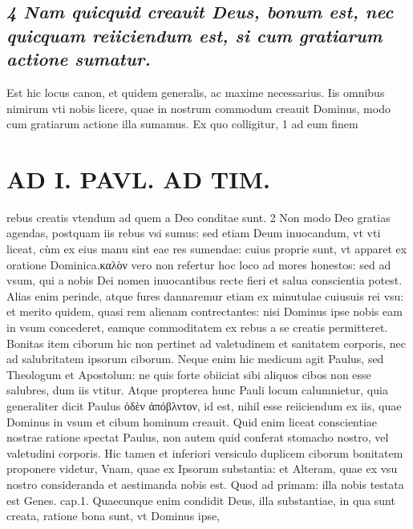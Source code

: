 \documentclass{article}
\begin{document}
\begin{pages}
\subsection*{\textit{4 Nam quicquid creauit Deus, bonum est, nec quicquam reiiciendum est, si cum gratiarum actione sumatur. }}\pstart Est hic locus canon, et quidem generalis, ac maxime necessarius. Iis omnibus nimirum vti nobis licere, quae in nostrum commodum creauit Dominus, modo cum gratiarum actione illa sumamus. Ex quo colligitur, 1 ad eum finem  \pend
\section*{AD I. PAVL. AD TIM. }
\marginpar{[ p.196 ]}\pstart rebus creatis vtendum ad quem a Deo conditae sunt. 2 Non modo Deo gratias agendas, postquam iis rebus vsi sumus: sed etiam Deum inuocandum, vt vti liceat, cùm ex eius manu sint eae res sumendae: cuius proprie sunt, vt apparet ex oratione Dominica.καλὸν vero non refertur hoc loco ad mores honestos: sed ad vsum, qui a nobis Dei nomen inuocantibus recte fieri et salua conscientia potest. Alias enim perinde, atque fures dannaremur etiam ex minutulae cuiusuis rei vsu: et merito quidem, quasi rem alienam contrectantes: nisi Dominus ipse nobis eam in vsum concederet, eamque commoditatem ex rebus a se creatis permitteret. Bonitas item ciborum hic non pertinet ad valetudinem et sanitatem corporis, nec ad salubritatem ipsorum ciborum. Neque enim hic medicum agit Paulus, sed Theologum et Apostolum: ne quis forte obiiciat sibi aliquos cibos non esse salubres, dum iis vtitur. Atque propterea hunc Pauli locum calumnietur, quia generaliter dicit Paulus ὀδὲν ἀπόβλντον, id est, nihil esse reiiciendum ex iis, quae Dominus in vsum et cibum hominum creauit. Quid enim liceat conscientiae nostrae ratione spectat Paulus, non autem quid conferat stomacho nostro, vel valetudini corporis.  \pend\pstart Hic tamen et inferiori versiculo duplicem ciborum bonitatem proponere videtur, Vnam, quae ex Ipsorum substantia: et Alteram, quae ex vsu nostro consideranda et aestimanda nobis est. Quod ad primam: illa nobis testata est Genes. cap.1. Quaecunque enim condidit Deus, illa substantiae, in qua sunt creata, ratione bona sunt, vt Dominus ipse,  \pend

\end{pages}
\end{document}
